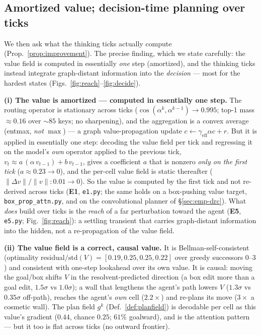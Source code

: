 \documentclass{article} %
\theoremstyle{plain}
\theoremstyle{definition}
\begin{document}
\subsection{Amortized value; decision-time planning over ticks}
\label{sec:emp-planning}

We then ask what the thinking ticks actually compute (Prop.~\ref{prop:improvement}).
The precise finding, which we state carefully: the value field is computed in
essentially \emph{one} step (amortized), and the thinking ticks instead integrate
graph-distant information into the \emph{decision} --- most for the hardest states
(Figs.~\ref{fig:reach}--\ref{fig:decide}).

\textbf{(i) The value is amortized --- computed in essentially one step.} The
routing operator is stationary across ticks
($\cos(\alpha^{k},\alpha^{k-1})\to0.995$; top-1 mass ${\approx}0.16$ over
${\sim}85$ keys; no sharpening), and the aggregation is a convex average (entmax,
\emph{not} $\max$) --- a graph value-propagation update
$c\leftarrow\gamma_{\mathrm{eff}}\alpha c+r$. But it is applied in essentially one
step: decoding the value field per tick and regressing it on the model's
\emph{own} operator applied to the previous tick,
$v_{t}\approx a\,(\alpha\,v_{t-1})+b\,v_{t-1}$, gives a coefficient $a$ that is
nonzero \emph{only on the first tick} ($a{\approx}0.23\!\to\!0$), and the per-cell
value field is static thereafter ($\lVert\Delta v\rVert/\lVert v\rVert:0.01\!\to\!0$).
So the value is computed by the first tick and not re-derived across ticks
(\textbf{E1}, \texttt{e1.py}; the same holds on a box-pushing value target,
\texttt{box\_prop\_attn.py}, and on the convolutional planner of
\S\ref{sec:emp-drc}). What \emph{does} build over ticks is the \emph{reach} of a far
perturbation toward the agent (\textbf{E5}, \texttt{e5.py}; Fig.~\ref{fig:reach}): a
settling transient that carries graph-distant information into the hidden, not a
re-propagation of the value field.

\textbf{(ii) The value field is a correct, causal value.} It is
Bellman-self-consistent (optimality residual$/\mathrm{std}(V)=[0.19,0.25,0.25,0.22]$
over greedy successors $0$--$3$) and consistent with one-step lookahead over its
own value. It is causal: moving the goal/box shifts $V$ in the resolvent-predicted
direction (a box edit more than a goal edit, $1.5\sigma$ vs $1.0\sigma$); a wall
that lengthens the agent's path lowers $V$ ($1.3\sigma$ vs $0.35\sigma$ off-path),
reaches the agent's \emph{own} cell ($2.2\times$) and re-plans its move ($3\times$
a cosmetic wall). The plan field $g^{k}$ (Def.~\ref{def:planfield}) is decodable
per cell as this value's gradient ($0.44$, chance $0.25$; $61\%$ goalward), and is
the attention pattern --- but it too is flat across ticks (no outward frontier).
\end{document}
